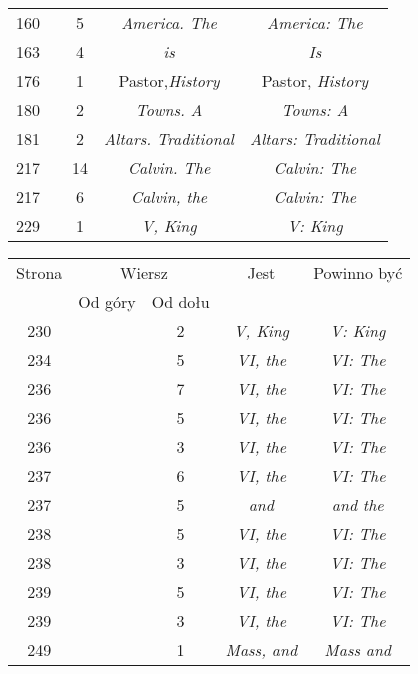 \documentclass[a4paper,11pt]{article}
\begin{document}
\begin{center}
\begin{tabular}{|c|c|c|c|c|}
    160 & & \hphantom{0}5 & \textit{America. The} & \textit{America: The} \\
    163 & & \hphantom{0}4 & \textit{is} & \textit{Is} \\
    176 & & \hphantom{0}1 & Pastor,\textit{History}
    & Pastor, \textit{History} \\
    180 & & \hphantom{0}2 & \textit{Towns. A} & \textit{Towns: A} \\
    181 & & \hphantom{0}2 & \textit{Altars. Traditional}
           & \textit{Altars: Traditional} \\
    217 & & 14 & \textit{Calvin. The} & \textit{Calvin: The} \\
    217 & & \hphantom{0}6 & \textit{Calvin, the} & \textit{Calvin: The} \\
    229 & & \hphantom{0}1 & \textit{V, King} & \textit{V: King} \\
    \hline
  \end{tabular}





  \newpage

  \begin{tabular}{|c|c|c|c|c|}
    \hline
    Strona & \multicolumn{2}{c|}{Wiersz} & Jest
                              & Powinno być \\ \cline{2-3}
    & Od góry & Od dołu & & \\
    \hline
    230 & & \hphantom{0}2 & \textit{V, King} & \textit{V: King} \\
    234 & & \hphantom{0}5 & \textit{VI, the} & \textit{VI: The} \\
    236 & & \hphantom{0}7 & \textit{VI, the} & \textit{VI: The} \\
    236 & & \hphantom{0}5 & \textit{VI, the} & \textit{VI: The} \\
    236 & & \hphantom{0}3 & \textit{VI, the} & \textit{VI: The} \\
    237 & & \hphantom{0}6 & \textit{VI, the} & \textit{VI: The} \\
    237 & & \hphantom{0}5 & \textit{and} & \textit{and the} \\
    238 & & \hphantom{0}5 & \textit{VI, the} & \textit{VI: The} \\
    238 & & \hphantom{0}3 & \textit{VI, the} & \textit{VI: The} \\
    239 & & \hphantom{0}5 & \textit{VI, the} & \textit{VI: The} \\
    239 & & \hphantom{0}3 & \textit{VI, the} & \textit{VI: The} \\
    249 & & \hphantom{0}1 & \textit{Mass, and} & \textit{Mass and} \\
    \hline
  \end{tabular}






\end{center}
\end{document}
